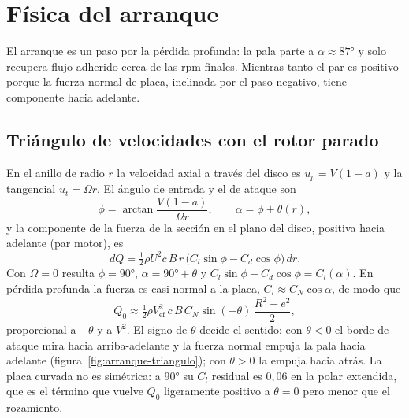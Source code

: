 \section{Física del arranque}\label{sec:arranque-fisica}

El arranque es un paso por la pérdida profunda: la pala parte a $\alpha\approx\ang{87}$ y
solo recupera flujo adherido cerca de las rpm finales. Mientras tanto el par es positivo
porque la fuerza normal de placa, inclinada por el paso negativo, tiene componente hacia
adelante.

\subsection{Triángulo de velocidades con el rotor parado}

En el anillo de radio $r$ la velocidad axial a través del disco es $u_p=V(1-a)$ y la
tangencial $u_t=\Omega r$. El ángulo de entrada y el de ataque son
\begin{equation}
  \phi=\arctan\frac{V(1-a)}{\Omega r},\qquad \alpha=\phi+\theta(r),
  \label{eq:arranque-alfa}
\end{equation}
y la componente de la fuerza de la sección en el plano del disco, positiva hacia adelante
(par motor), es
\begin{equation}
  dQ=\tfrac12\rho U^2 c\,B\,r\,\bigl(C_l\sin\phi-C_d\cos\phi\bigr)\,dr .
  \label{eq:arranque-dq}
\end{equation}
Con $\Omega=0$ resulta $\phi=\ang{90}$, $\alpha=\ang{90}+\theta$ y
$C_l\sin\phi-C_d\cos\phi=C_l(\alpha)$. En pérdida profunda la fuerza es casi normal a la
placa, $C_l\approx C_N\cos\alpha$, de modo que
\begin{equation}
  Q_0\approx\tfrac12\rho V_\text{ef}^2\,c\,B\,C_N\sin(-\theta)\,\frac{R^2-e^2}{2},
  \label{eq:arranque-q0}
\end{equation}
proporcional a $-\theta$ y a $V^2$. El signo de $\theta$ decide el sentido: con
$\theta<0$ el borde de ataque mira hacia arriba-adelante y la fuerza normal empuja la pala
hacia adelante (figura~\ref{fig:arranque-triangulo}); con $\theta>0$ la empuja hacia atrás.
La placa curvada no es simétrica: a \ang{90} su $C_l$ residual es
$0{,}06$ en la polar extendida, que es el término que vuelve $Q_0$ ligeramente positivo a
$\theta=0$ pero menor que el rozamiento.

